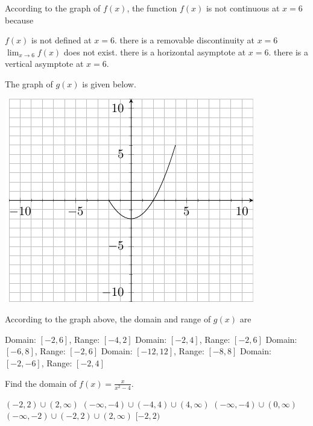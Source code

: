 \documentclass[11pt]{article}
\begin{document}
\begin{questions}
\begin{multiplechoice}{5}
\begin{questions}
\begin{multiplechoice}{5}




\question According to the graph of $f(x)$, the function $f(x)$ is not continuous at $x=6$ because
\begin{answers}{3}
\ans $f(x)$ is not defined at $x=6$.
\ans there is a removable discontinuity at $x=6$
\ans $\lim_{x\to 6}f(x)$ does not exist.
\ans there is a horizontal asymptote at $x=6$. 
\ans there is a vertical asymptote at $x=6$.
\end{answers}



\nextpage

\question The graph of $g(x)$ is given below.\\

\begin{minipage}{\linewidth}%
\centering
\makebox[\linewidth]{}
\includegraphics{exam1graph2.pdf}
\label{graph2exam1}%
\end{minipage}
According to the graph above, the domain and range of $g(x)$ are
\begin{answers}{2}
\ans Domain: $[-2,6]$, Range: $[-4,2]$
\ans Domain: $[-2,4]$, Range: $[-2,6]$
\ans Domain: $[-6,8]$, Range: $[-2,6]$
\ans Domain: $[-12,12]$, Range: $[-8,8]$
\ans Domain: $[-2,-6]$, Range: $[-2,4]$
\end{answers}

\question Find the domain of $f(x) = \frac{x}{x^2-4}$.
\begin{answers}{2}
\ans $(-2,2) \cup (2, \infty)$
\ans $(-\infty, -4) \cup (-4,4) \cup (4, \infty) $
\ans  $(-\infty, -4) \cup (0, \infty)$
\ans  $(-\infty, -2) \cup (-2,2) \cup (2, \infty)$
\ans $[-2,2)$
\end{answers}



\end{multiplechoice}
\end{questions}
\end{multiplechoice}
\end{questions}
\end{document}
